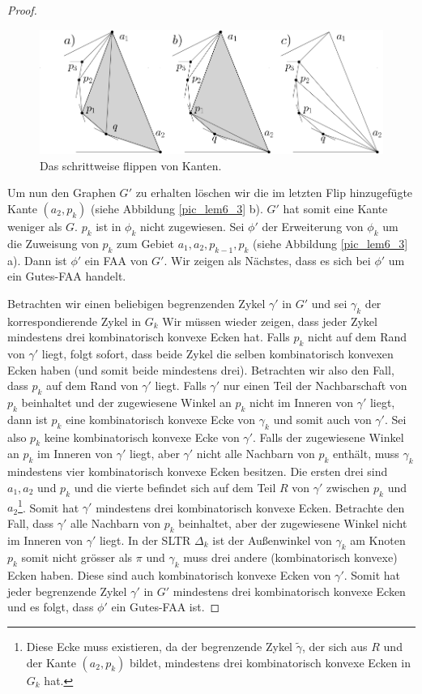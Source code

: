 \begin{proof}
\begin{figure}
	\centering
	  \includegraphics[width=1\textwidth]{lem6_2.png}
    	\caption{Das schrittweise flippen von Kanten.}
    	\label{pic_lem6_2}
\end{figure}

Um nun den Graphen $G'$ zu erhalten löschen wir die im letzten Flip hinzugefügte Kante $(a_2,p_{k})$ (siehe Abbildung \ref{pic_lem6_3} b). $G'$ hat somit eine Kante weniger als $G$. $p_k$ ist in $\phi_k$ nicht zugewiesen. Sei $\phi'$ der Erweiterung von $\phi_k$ um die Zuweisung von $p_k$ zum Gebiet $a_1,a_2,p_{k-1},p_k$ (siehe Abbildung \ref{pic_lem6_3} a). Dann ist $\phi'$ ein FAA von $G'$. Wir zeigen als Nächstes, dass es sich bei $\phi'$ um ein Gutes-FAA handelt.

Betrachten wir einen beliebigen begrenzenden Zykel $\gamma'$ in $G'$ und sei $\gamma_k$ der korrespondierende Zykel in $G_k$ Wir müssen wieder zeigen, dass jeder Zykel mindestens drei kombinatorisch konvexe Ecken hat. Falls $p_k$ nicht auf dem Rand von $\gamma'$ liegt, folgt sofort, dass beide Zykel die selben kombinatorisch konvexen Ecken haben (und somit beide mindestens drei). Betrachten wir also den Fall, dass $p_k$ auf dem Rand von $\gamma'$ liegt. Falls $\gamma'$ nur einen Teil der Nachbarschaft von $p_k$ beinhaltet und der zugewiesene Winkel an $p_k$ nicht im Inneren von $\gamma'$ liegt, dann ist $p_k$ eine kombinatorisch konvexe Ecke von $\gamma_k$ und somit auch von $\gamma'$. Sei also $p_k$ keine kombinatorisch konvexe Ecke von $\gamma'$. Falls der zugewiesene Winkel an $p_k$ im Inneren von $\gamma'$ liegt, aber $\gamma'$ nicht alle Nachbarn von $p_k$ enthält, muss $\gamma_k$ mindestens vier kombinatorisch konvexe Ecken besitzen. Die ersten drei sind $a_1,a_2$ und $p_k$ und die vierte befindet sich auf dem Teil $R$ von $\gamma'$ zwischen $p_k$ und $a_2$\footnote{Diese Ecke muss existieren, da der begrenzende Zykel $\tilde{\gamma}$, der sich aus $R$ und der Kante $(a_2,p_k)$ bildet, mindestens drei kombinatorisch konvexe Ecken in $G_k$ hat.}. Somit hat $\gamma'$ mindestens drei kombinatorisch konvexe Ecken. Betrachte den Fall, dass $\gamma'$ alle Nachbarn von $p_k$ beinhaltet, aber der zugewiesene Winkel nicht im Inneren von $\gamma'$ liegt. In der SLTR $\Delta_k$ ist der Außenwinkel von $\gamma_k$ am Knoten $p_k$ somit nicht grösser als $\pi$ und $\gamma_k$ muss drei andere (kombinatorisch konvexe) Ecken haben. Diese sind auch kombinatorisch konvexe Ecken von $\gamma'$. Somit hat jeder begrenzende Zykel $\gamma'$ in $G'$ mindestens drei kombinatorisch konvexe Ecken und es folgt, dass $\phi'$ ein Gutes-FAA ist.


\end{proof}
